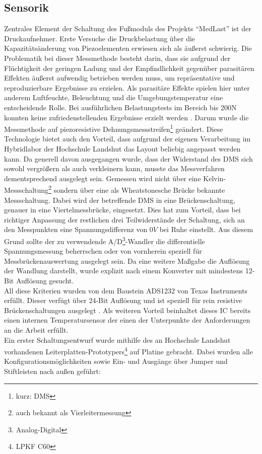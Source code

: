 \documentclass[12pt]{scrreprt} %
\begin{document}
\subsection{Sensorik}
\label{Sensorik}
Zentrales Element der Schaltung des Fußmoduls des Projekts "`MedLast"' ist der Druckaufnehmer. Erste Versuche die Druckbelastung über die Kapazitätsänderung von Piezoelementen erwiesen sich als äußerst schwierig. Die Problematik bei dieser Messmethode besteht darin, dass sie aufgrund der Flüchtigkeit der geringen Ladung und der Empfindlichkeit gegenüber parasitären Effekten äußerst aufwendig betrieben werden muss, um repräsentative und reproduzierbare Ergebnisse zu erzielen. Als parasitäre Effekte spielen hier unter anderem Luftfeuchte, Beleuchtung und die Umgebungstemperatur eine entscheidende Rolle. Bei ausführlichen Belastungstests im Bereich bis 200N konnten keine zufriedenstellenden Ergebnisse erzielt werden \citep{Jobstmann2012}. Darum wurde die Messmethode auf piezoresistive Dehnungsmessstreifen\footnote{kurz: DMS} geändert. Diese Technologie bietet auch den Vorteil, dass aufgrund der eigenen Verarbeitung im Hybridlabor der Hochschule Landshut das Layout beliebig angepasst werden kann. Da generell davon ausgegangen wurde, dass der Widerstand des DMS sich sowohl vergrößern als auch verkleinern kann, musste das Messverfahren dementsprechend ausgelegt sein. Gemessen wird nicht über eine Kelvin-Messschaltung\footnote{auch bekannt als Vierleitermessung} sondern über eine als Wheatstonesche Brücke bekannte Messschaltung. Dabei wird der betreffende DMS in eine Brückenschaltung, genauer in eine Viertelmessbrücke, eingesetzt. Dies hat zum Vorteil, dass bei richtiger Anpassung der restlichen drei Teilwiderstände der Schaltung, sich an den Messpunkten eine Spannungsdifferenz von $0V$ bei Ruhe einstellt. Aus diesem Grund sollte der zu verwendende A/D\footnote{Analog-Digital}-Wandler die differentielle Spannungsmessung beherrschen oder von vornherein speziell für Messbrückenauswertung ausgelegt sein. Da eine weitere Maßgabe die Auflösung der Wandlung darstellt, wurde explizit nach einem Konverter mit mindestens 12-Bit Auflösung gesucht.\\
All diese Kriterien wurden von dem Baustein ADS1232 von Texas Instruments erfüllt. Dieser verfügt über 24-Bit Auflösung und ist speziell für rein resistive Brückenschaltungen ausgelegt \citep{ADS1232}. Als weiteren Vorteil beinhaltet dieses IC bereits einen internen Temperatursensor der einen der Unterpunkte der Anforderungen an die Arbeit erfüllt.\\
Ein erster Schaltungsentwurf wurde mithilfe des an Hochschule Landshut vorhandenen Leiterplatten-Prototypers\footnote{LPKF C60} auf Platine gebracht. Dabei wurden alle Konfigurationsmöglichkeiten sowie Ein- und Ausgänge über Jumper und Stiftleisten nach außen geführt:
\end{document}
